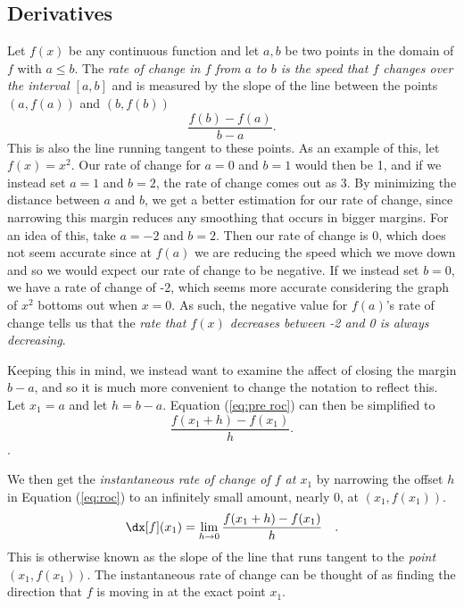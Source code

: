 \subsection{Derivatives}

Let $f(x)$ be any continuous function and let $a, b$ be two points in the domain of $f$ with $a\leq b$. The \emph{rate of change in $f$ from $a$ to $b$ is the speed that $f$ changes over the interval $[a,b]$} and is measured by the slope of the line between
the points $(a, f(a))$ and $(b, f(b))$
\begin{equation}\label{eq:pre roc}
    \frac{f(b)-f(a)}{b-a}.
\end{equation}
This is also the line running tangent to these points.
As an example of this, let $f(x)=x^2$. Our rate of change for $a=0$ and $b=1$ would then be 1, and if we instead set $a=1$ and $b=2$, the rate of change comes out as 3. By minimizing the distance between $a$ and $b$, we get a better estimation for our rate of change, since narrowing this margin reduces any smoothing that occurs in bigger margins. For an idea of this, take $a=-2$ and $b=2$. Then our rate of change is $0$, which does not seem accurate since at $f(a)$ we are reducing the speed which we move down and so we would expect our rate of change to be negative. If we instead set $b=0$, we have a rate of change of -2, which seems more accurate considering the graph of $x^2$ bottoms out when $x=0$. As such, the negative value for $f(a)$'s rate of change tells us that the \emph{rate that $f(x)$ decreases between -2 and 0 is always decreasing}.

Keeping this in mind, we instead want to examine the affect of closing the margin $b-a$, and so it is much more convenient to change the notation to reflect this. Let $x_1 = a$ and let $h = b - a$. Equation (\ref{eq:pre roc}) can then be simplified to
\begin{equation}\label{eq:roc}
    \frac{f(x_1+h)-f(x_1)}{h}.
\end{equation}.

We then get the \emph{instantaneous rate of change of $f$ at $x_1$} by
narrowing the offset $h$ in Equation (\ref{eq:roc}) to an infinitely small
amount, nearly 0, at $(x_1, f(x_1))$.
\begin{equation}\label{eq:iroc}
    \dx[f] (x_1) = \lim_{h\rightarrow 0} \frac{f(x_1 + h) - f(x_1)}{h} \quad .
\end{equation}
This is otherwise known as the slope of the line that runs tangent to the \emph{point} $(x_1,f(x_1))$. The instantaneous rate of change can be thought of as finding the direction that $f$ is moving in at the exact point $x_1$.

